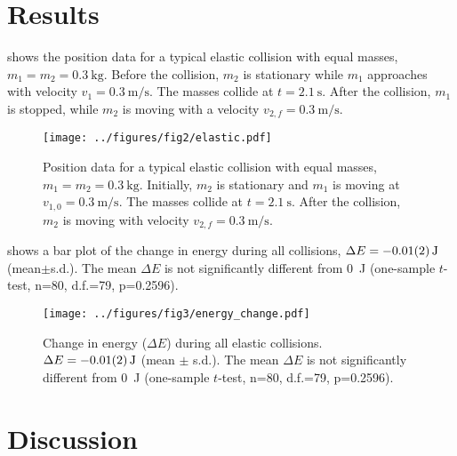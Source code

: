 \documentclass[aps,prl,preprint]{revtex4-1}
\begin{document}
\section{Results}
 shows the position data for a typical elastic collision with equal masses, $m_1=m_2=\qty{0.3}{\kilo\gram}$. Before the collision, $m_2$ is stationary while $m_1$ approaches with velocity $v_1=\qty{0.3}{\meter\per\second}$. The masses collide at $t=\qty{2.1}{\second}$. After the collision, $m_1$ is stopped, while $m_2$ is moving with a velocity $v_{2,f}=\qty{0.3}{\meter\per\second}$. 
\begin{figure}
\begin{center}
\texttt{[image: ../figures/fig2/elastic.pdf]}
\end{center}
\caption{Position data for a typical elastic collision with equal masses, $m_1=m_2=\qty{0.3}{\kilo\gram}$. Initially, $m_2$ is stationary and $m_1$ is moving at $v_{1,0}=\qty{0.3}{\meter\per\second}$. The masses collide at $t=\SI{2.1}{\second}$. After the collision, $m_2$ is moving with velocity $v_{2,f}=\qty{0.3}{\meter\per\second}$. }
\label{fig:results1}
\end{figure}

 shows a bar plot of the change in energy during all collisions, $\Delta E = \qty{-0.01\pm0.02}{\joule}$ (mean$\pm$s.d.). The mean $\Delta E$ is not significantly different from \qty{0}{\joule} (one-sample $t$-test, n=80, d.f.=79, p=0.2596). 
\begin{figure}
\begin{center}
\texttt{[image: ../figures/fig3/energy\_change.pdf]}
\end{center}
\caption{Change in energy ($\Delta E$) during all elastic collisions. $\Delta E = \qty{-0.01\pm0.02}{\joule}$ (mean $\pm$ s.d.). The mean $\Delta E$ is not significantly different from \qty{0}{\joule} (one-sample $t$-test, n=80, d.f.=79, p=0.2596).}
\label{fig:results2}
\end{figure}


\section{Discussion}
\end{document}

